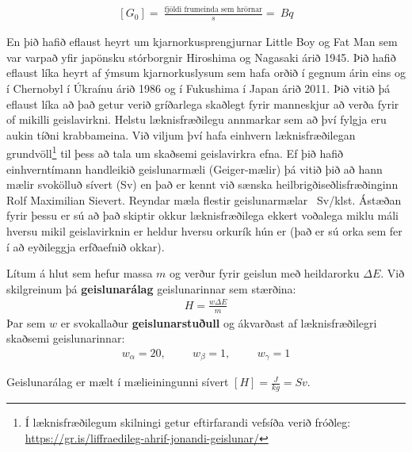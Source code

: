 \ifdefined \wholebook \else\documentclass[oneside]{book}\usepackage{EdlBook}\graphicspath{{figures/}}
\begin{document}
\begin{align*}
    \left[ G_0 \right] = \SI{}{\frac{\text{fjöldi frumeinda sem hrörnar}}{s}} = \SI{}{Bq}
\end{align*}

En þið hafið eflaust heyrt um kjarnorkusprengjurnar Little Boy og Fat Man sem var varpað yfir japönsku stórborgnir Hiroshima og Nagasaki árið 1945. Þið hafið eflaust líka heyrt af ýmsum kjarnorkuslysum sem hafa orðið í gegnum árin eins og í Chernobyl í Úkraínu árið 1986 og í Fukushima í Japan árið 2011. Þið vitið þá eflaust líka að það getur verið gríðarlega skaðlegt fyrir manneskjur að verða fyrir of mikilli geislavirkni. Helstu læknisfræðilegu annmarkar sem að því fylgja eru aukin tíðni krabbameina. Við viljum því hafa einhvern læknisfræðilegan grundvöll\footnote{Í læknisfræðilegum skilningi getur eftirfarandi vefsíða verið fróðleg: \href{https://gr.is/liffraedileg-ahrif-jonandi-geislunar/}{https://gr.is/liffraedileg-ahrif-jonandi-geislunar/}} til þess að tala um skaðsemi geislavirkra efna. Ef þið hafið einhverntímann handleikið geislunarmæli (Geiger-mælir) þá vitið þið að hann mælir svokölluð sívert (\si{Sv}) en það er kennt við sænska heilbrigðiseðlisfræðinginn Rolf Maximilian Sievert. Reyndar mæla flestir geislunarmælar \si{\mu Sv/klst}. Ástæðan fyrir þessu er sú að það skiptir okkur læknisfræðilega ekkert voðalega miklu máli hversu mikil geislavirknin er heldur hversu orkurík hún er (það er sú orka sem fer í að eyðileggja erfðaefnið okkar). 


\begin{tcolorbox}
\begin{definition}
Lítum á hlut sem hefur massa $m$ og verður fyrir geislun með heildarorku $\Delta E$. Við skilgreinum þá \textbf{geislunarálag} geislunarinnar sem stærðina:
\begin{align*}
    H = \frac{w\Delta E}{m}
\end{align*}
Þar sem $w$ er svokallaður \textbf{geislunarstuðull} og ákvarðast af læknisfræðilegri skaðsemi geislunarinnar:
\begin{align*}
    w_\alpha = 20, \hspace{1cm} w_\beta = 1, \hspace{1cm} w_\gamma = 1
\end{align*}

Geislunarálag er mælt í mælieiningunni sívert $\left[ H \right] = \frac{\si{J}}{\si{kg}} = \si{Sv}$.
\end{definition}
\end{tcolorbox}
\end{document}
